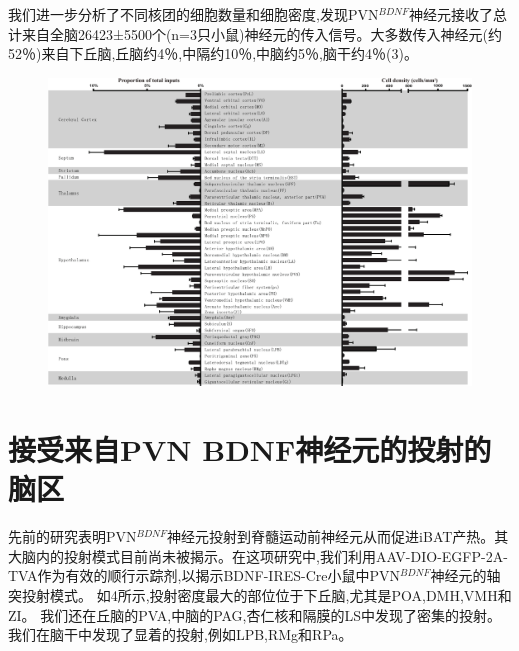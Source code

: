 我们进一步分析了不同核团的细胞数量和细胞密度,发现PVN$^{BDNF}$神经元接收了总计来自全脑26423±5500个(n=3只小鼠)神经元的传入信号。大多数传入神经元(约52％)来自下丘脑,丘脑约4％,中隔约10％,中脑约5％,脑干约4％(\figurename{3})。

\begin{figure}[!htbp]
    \centering
    \includegraphics[trim = 0mm 0mm 0mm 0mm, clip, width=\textwidth]{Img/figure3.pdf}
    \label{fig:figure3}
\end{figure}

\section{接受来自PVN BDNF神经元的投射的脑区}
先前的研究表明PVN$^{BDNF}$神经元投射到脊髓运动前神经元从而促进iBAT产热\citep{an2015discrete}。其大脑内的投射模式目前尚未被揭示。在这项研究中,我们利用AAV-DIO-EGFP-2A-TVA作为有效的顺行示踪剂,以揭示BDNF-IRES-Cre小鼠中PVN$^{BDNF}$神经元的轴突投射模式。 如\figurename{4}所示,投射密度最大的部位位于下丘脑,尤其是POA,DMH,VMH和ZI。 我们还在丘脑的PVA,中脑的PAG,杏仁核和隔膜的LS中发现了密集的投射。 我们在脑干中发现了显着的投射,例如LPB,RMg和RPa。

